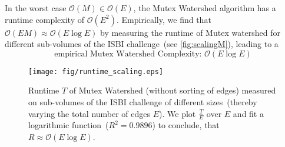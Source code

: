 \noindent In the worst case $\mathcal{O}(M) \in \mathcal{O}(E)$, the Mutex Watershed algorithm has a runtime complexity of  $\mathcal{O}(E^2)$. Empirically, we find that $\mathcal{O}(EM) \approx \mathcal{O}(E\log E)$ by measuring the runtime of Mutex watershed for different sub-volumes of the ISBI challenge~(see \autoref{fig:scalingM}), leading to a 
\begin{equation}
    \text{empirical Mutex Watershed Complexity: }\mathcal{O}(E \log E)
\end{equation}


\begin{figure}
   \centering
   \texttt{[image: fig/runtime\_scaling.eps]}
   \caption{Runtime $T$ of Mutex Watershed (without sorting of edges) measured on sub-volumes of the ISBI challenge of different sizes~(thereby varying the total number of edges $E$). We plot $\frac{T}{E}$ over $E$ and fit a logarithmic function~($R^2 = 0.9896$) to conclude, that $R \approx \mathcal{O}(E \log E)$.}
\label{fig:scalingM}
\end{figure}


 
